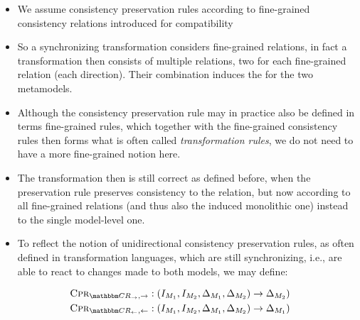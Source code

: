 \begin{itemize}
    \item We assume consistency preservation rules according to fine-grained consistency relations introduced for compatibility
    \item So a synchronizing transformation considers fine-grained relations, in fact a transformation then consists of multiple relations, two for each fine-grained relation (each direction). Their combination induces the \modellevelconsistencyrelation for the two metamodels.
    \item Although the consistency preservation rule may in practice also be defined in terms fine-grained rules, which together with the fine-grained consistency rules then forms what is often called \emph{transformation rules}, we do not need to have a more fine-grained notion here.
    \item The transformation then is still correct as defined before, when the preservation rule preserves consistency to the relation, but now according to all fine-grained relations (and thus also the induced monolithic one) instead to the single model-level one.
    \item To reflect the notion of unidirectional consistency preservation rules, as often defined in transformation languages, which are still synchronizing, i.e., are able to react to changes made to both models, we may define:
\end{itemize}
\begin{align*}
    \consistencypreservationrule{\consistencyrelationset{CR}_{\rightarrow},\rightarrow} : (\metamodelinstanceset{M}{1}, \metamodelinstanceset{M}{2}, \changeuniverse{\metamodel{M}{1}}, \changeuniverse{\metamodel{M}{2}}) \rightarrow \changeuniverse{\metamodel{M}{2}})\\
    \consistencypreservationrule{\consistencyrelationset{CR}_{\leftarrow},\leftarrow} : (\metamodelinstanceset{M}{1}, \metamodelinstanceset{M}{2}, \changeuniverse{\metamodel{M}{1}}, \changeuniverse{\metamodel{M}{2}}) \rightarrow \changeuniverse{\metamodel{M}{1}})
\end{align*}

